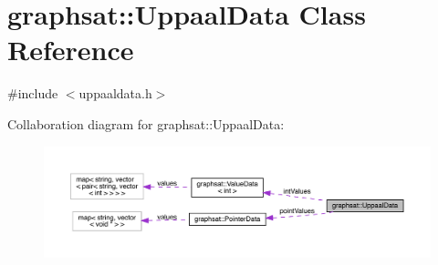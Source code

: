\hypertarget{classgraphsat_1_1_uppaal_data}{}\section{graphsat\+::Uppaal\+Data Class Reference}
\label{classgraphsat_1_1_uppaal_data}


{\ttfamily \#include $<$uppaaldata.\+h$>$}



Collaboration diagram for graphsat\+::Uppaal\+Data\+:\nopagebreak
\begin{figure}[H]
\begin{center}
\leavevmode
\includegraphics[width=350pt]{classgraphsat_1_1_uppaal_data__coll__graph}
\end{center}
\end{figure}
